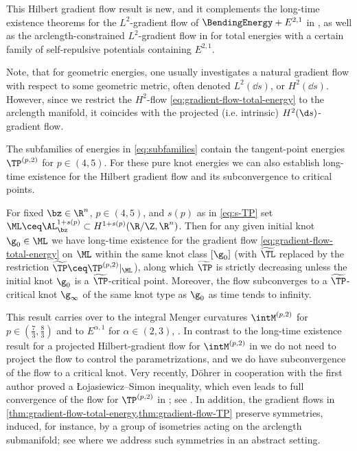 This Hilbert gradient flow result is new, and it 
complements the long-time existence theorems
for the $L^2$-gradient flow of $\BendingEnergy+E^{2,1}$ in 
\cite[Theorem 1]{lin-schwetlick_2010},
as well as the arclength-constrained $L^2$-gradient flow in
\cite[Theorem 4.13]{vonbrecht-blair_2017} for total energies with a certain
family
of self-repulsive
potentials containing $E^{2,1}$.

Note, that for geometric energies, one usually investigates a natural gradient flow with respect to some geometric metric, often denoted $ L^2(\dd s) $, or $ H^2(\dd s) $. However, since we restrict the $ H^2 $-flow \cref{eq:gradient-flow-total-energy} to the arclength manifold, it coincides with the projected (i.e. intrinsic) $ H^2(\d s) $-gradient flow.

The subfamilies of energies in \cref{eq:subfamilies} contain 
the tangent-point energies $\TP^{(p,2)}$ for $p\in (4,5)$. For these
pure knot energies we can
also establish long-time existence for the Hilbert gradient flow
and its subconvergence
to critical points.
\begin{theorem}
\label{thm:gradient-flow-TP}
For fixed $\bz \in \R^n$, $p\in (4,5)$, and $s(p)$ as in \cref{eq:s-TP} set 
$\ML\ceq\AL^{1+s(p)}_\bz\subset H^{1+s(p)}(\R/\Z,\R^n)$. 
Then for  any given initial knot $\g_0\in\ML$
we have long-time existence for the gradient
flow \cref{eq:gradient-flow-total-energy} on $\ML$ 
within the same knot class $[\g_0]$ (with $\widetilde{\TL}$ 
replaced by the restriction $\widetilde{\TP}\ceq
\TP^{(p,2)}|_{\ML}$), along which $\widetilde{\TP}$ is strictly
decreasing unless the initial knot $\g_0$ is 
a $\widetilde{\TP}$-critical point. Moreover,
the flow subconverges to a $\widetilde{\TP}$-critical knot $\g_\infty$
of the  same
knot type as $\g_0$ as time
tends to infinity. 
\end{theorem}
This result carries over to the integral Menger curvatures
$\intM^{(p,2)}$ for $p\in (\frac{7}{3},\frac{8}{3})$ and to $ E^{\alpha,1} $ for $ \alpha \in (2,3) $, \cite{freches_2025}.
In contrast to the long-time existence result for a projected 
Hilbert-gradient
flow for $\intM^{(p,2)}$ in
\cite[Theorem 1.1]{knappmann-etal_2023} we do not need to project
the flow to control the parametrizations, and we do have subconvergence
of the flow
to a critical knot. Very recently, D\"ohrer in cooperation with the
first author proved a {\L}ojasiewicz--Simon inequality, which even leads
to full 
convergence of the flow for $\TP^{(p,2)}$ in ; 
see \cite[Theorem 1.5]{doehrer-freches_2025}.
In addition, the gradient flows in \cref{thm:gradient-flow-total-energy,thm:gradient-flow-TP} preserve
symmetries, induced, for instance, by 
a group of isometries acting on the arclength submanifold; see 
 where we address such symmetries
in an abstract setting. 

